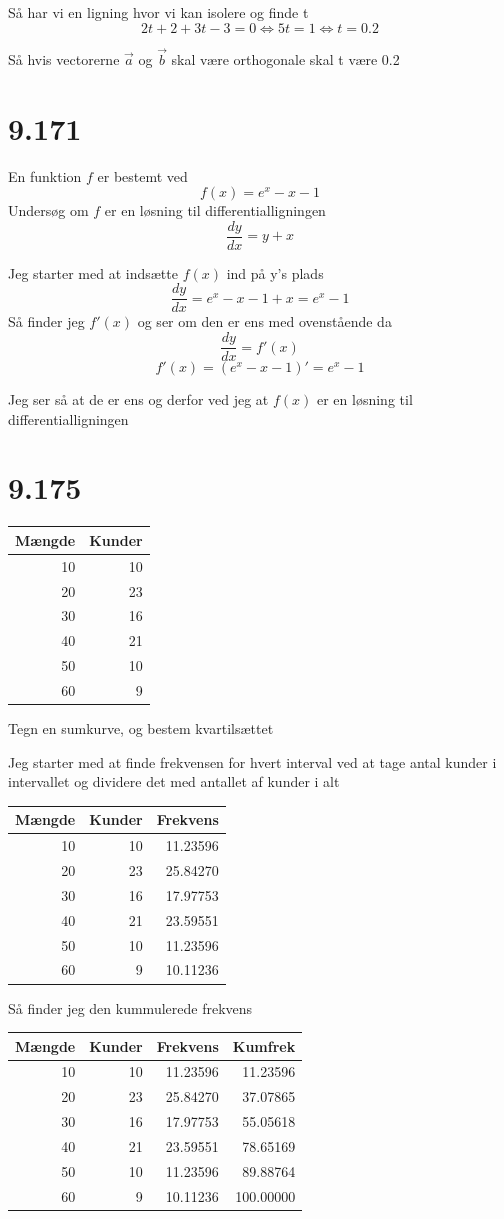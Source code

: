Så har vi en ligning hvor vi kan isolere og finde t
\[2t+2+3t-3=0 \Leftrightarrow 5t = 1 \Leftrightarrow t = 0.2\]

Så hvis vectorerne \(\vec{a}\) og \(\vec{b}\) skal være orthogonale skal
t være 0.2

\section{9.171}\label{section-2}

En funktion \(f\) er bestemt ved \[f(x) = e^x - x - 1\] Undersøg om
\(f\) er en løsning til differentialligningen \[\frac{dy}{dx} = y + x\]

Jeg starter med at indsætte \(f(x)\) ind på y's plads
\[\frac{dy}{dx} = e^x - x - 1 + x = e^x - 1\] Så finder jeg \(f'(x)\) og
ser om den er ens med ovenstående da \[\frac{dy}{dx} = f'(x)\]
\[f'(x)=(e^x - x - 1)'= e^x - 1\]

Jeg ser så at de er ens og derfor ved jeg at \(f(x)\) er en løsning til
differentialligningen

\section{9.175}\label{section-3}

\begin{longtable}[]{@{}rr@{}}
\toprule
Mængde & Kunder\tabularnewline
\midrule
\endhead
10 & 10\tabularnewline
20 & 23\tabularnewline
30 & 16\tabularnewline
40 & 21\tabularnewline
50 & 10\tabularnewline
60 & 9\tabularnewline
\bottomrule
\end{longtable}

Tegn en sumkurve, og bestem kvartilsættet

Jeg starter med at finde frekvensen for hvert interval ved at tage antal
kunder i intervallet og dividere det med antallet af kunder i alt

\begin{longtable}[]{@{}rrr@{}}
\toprule
Mængde & Kunder & Frekvens\tabularnewline
\midrule
\endhead
10 & 10 & 11.23596\tabularnewline
20 & 23 & 25.84270\tabularnewline
30 & 16 & 17.97753\tabularnewline
40 & 21 & 23.59551\tabularnewline
50 & 10 & 11.23596\tabularnewline
60 & 9 & 10.11236\tabularnewline
\bottomrule
\end{longtable}

Så finder jeg den kummulerede frekvens

\begin{longtable}[]{@{}rrrr@{}}
\toprule
Mængde & Kunder & Frekvens & Kumfrek\tabularnewline
\midrule
\endhead
10 & 10 & 11.23596 & 11.23596\tabularnewline
20 & 23 & 25.84270 & 37.07865\tabularnewline
30 & 16 & 17.97753 & 55.05618\tabularnewline
40 & 21 & 23.59551 & 78.65169\tabularnewline
50 & 10 & 11.23596 & 89.88764\tabularnewline
60 & 9 & 10.11236 & 100.00000\tabularnewline
\bottomrule
\end{longtable}

